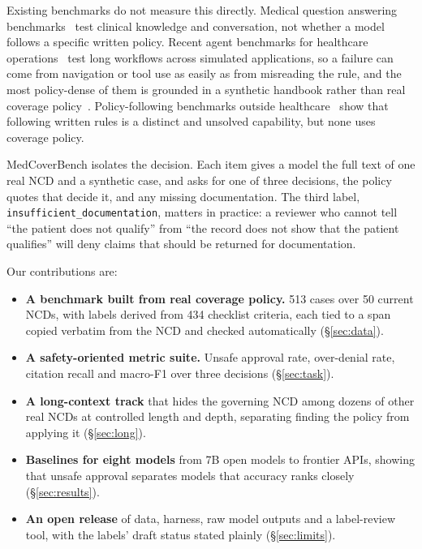 \documentclass[11pt]{article}
\newcommand{\insuf}{\texttt{insufficient\_documentation}}
\begin{document}
Existing benchmarks do not measure this directly. Medical question answering
benchmarks~\citep{jin2021medqa,arora2025healthbench,warner2026medmarks} test clinical knowledge
and conversation, not whether a model follows a specific written policy. Recent agent benchmarks
for healthcare operations~\citep{chen2026chibench,bedi2026healthadminbench} test long workflows
across simulated applications, so a failure can come from navigation or tool use as easily as
from misreading the rule, and the most policy-dense of them is grounded in a synthetic handbook
rather than real coverage policy~\citep{chen2026chibench}. Policy-following benchmarks outside
healthcare~\citep{yao2024taubench,guha2023legalbench,koreeda2021contractnli} show that following
written rules is a distinct and unsolved capability, but none uses coverage policy.

MedCoverBench isolates the decision. Each item gives a model the full text of one real NCD and a
synthetic case, and asks for one of three decisions, the policy quotes that decide it, and any
missing documentation. The third label, \insuf{}, matters in practice: a reviewer who cannot
tell ``the patient does not qualify'' from ``the record does not show that the patient
qualifies'' will deny claims that should be returned for documentation.

Our contributions are:
\begin{itemize}[leftmargin=*,itemsep=2pt]
  \item \textbf{A benchmark built from real coverage policy.} 513 cases over 50 current NCDs,
    with labels derived from 434 checklist criteria, each tied to a span copied verbatim from
    the NCD and checked automatically (\S\ref{sec:data}).
  \item \textbf{A safety-oriented metric suite.} Unsafe approval rate, over-denial rate,
    citation recall and macro-F1 over three decisions (\S\ref{sec:task}).
  \item \textbf{A long-context track} that hides the governing NCD among dozens of other real
    NCDs at controlled length and depth, separating finding the policy from applying it
    (\S\ref{sec:long}).
  \item \textbf{Baselines for eight models} from 7B open models to frontier APIs, showing that
    unsafe approval separates models that accuracy ranks closely (\S\ref{sec:results}).
  \item \textbf{An open release} of data, harness, raw model outputs and a label-review tool,
    with the labels' draft status stated plainly (\S\ref{sec:limits}).
\end{itemize}
\end{document}
